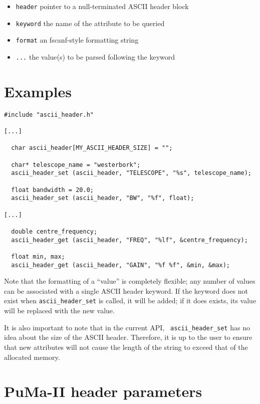 \begin{itemize}
\item {\tt header} pointer to a null-terminated ASCII header block

\item {\tt keyword} the name of the attribute to be queried

\item {\tt format} an fscanf-style formatting string

\item {\tt ...} the value(s) to be parsed following the keyword
\end{itemize}

\section{Examples}

\begin{verbatim}
#include "ascii_header.h"

[...]

  char ascii_header[MY_ASCII_HEADER_SIZE] = "";

  char* telescope_name = "westerbork";
  ascii_header_set (ascii_header, "TELESCOPE", "%s", telescope_name);

  float bandwidth = 20.0;
  ascii_header_set (ascii_header, "BW", "%f", float);

[...]

  double centre_frequency;
  ascii_header_get (ascii_header, "FREQ", "%lf", &centre_frequency);

  float min, max;
  ascii_header_get (ascii_header, "GAIN", "%f %f", &min, &max);
\end{verbatim}

Note that the formatting of a ``value'' is completely flexible; any
number of values can be associated with a single ASCII header keyword.
If the keyword does not exist when {\tt ascii\_header\_set} is called,
it will be added; if it does exists, its value will be replaced with
the new value.

It is also important to note that in the current API, {\tt
ascii\_header\_set} has no idea about the size of the ASCII header.
Therefore, it is up to the user to ensure that new attributes will not
cause the length of the string to exceed that of the allocated memory.

\section{PuMa-II header parameters}

